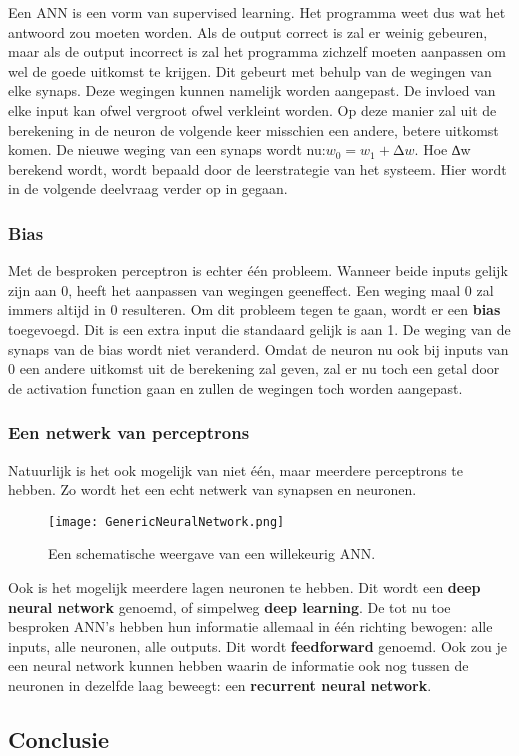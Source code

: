Een ANN is een vorm van supervised learning. Het programma weet dus wat het antwoord zou moeten worden. Als de output correct is zal er weinig gebeuren, maar als de output incorrect is zal het programma zichzelf moeten aanpassen om wel de goede uitkomst te krijgen. Dit gebeurt met behulp van de wegingen van elke synaps. Deze wegingen kunnen namelijk worden aangepast. De invloed van elke input kan ofwel vergroot ofwel verkleint worden. Op deze manier zal uit de berekening in de neuron de volgende keer misschien een andere, betere uitkomst komen. De nieuwe weging van een synaps wordt nu:$ w_{0} = w_{1} + ∆w $.
Hoe ∆w berekend wordt, wordt bepaald door de leerstrategie van het systeem. Hier wordt in de volgende deelvraag verder op in gegaan.

\subsubsection{Bias}
Met de besproken perceptron is echter één probleem. Wanneer beide inputs gelijk zijn aan 0, heeft het aanpassen van wegingen geeneffect. Een weging maal 0 zal immers altijd in 0 resulteren. Om dit probleem tegen te gaan, wordt er een \textbf{bias} toegevoegd. Dit is een extra input die standaard gelijk is aan 1. De weging van de synaps van de bias wordt niet veranderd. Omdat de neuron nu ook bij inputs van 0 een andere uitkomst uit de berekening zal geven, zal er nu toch een getal door de activation function gaan en zullen de wegingen toch worden aangepast. 

\subsubsection{Een netwerk van perceptrons}
Natuurlijk is het ook mogelijk van niet één, maar meerdere perceptrons te hebben. Zo wordt het een echt netwerk van synapsen en neuronen.

\begin{figure}[h]
  \centering
    \texttt{[image: GenericNeuralNetwork.png]}
  \caption{Een schematische weergave van een willekeurig ANN.}
  \label{fig:ANN}
\end{figure}

Ook is het mogelijk meerdere lagen neuronen te hebben. Dit wordt een \textbf{deep neural network} genoemd, of simpelweg \textbf{deep learning}.
De tot nu toe besproken ANN’s hebben hun informatie allemaal in één richting bewogen: alle inputs, alle neuronen, alle outputs. Dit wordt \textbf{feedforward} genoemd. Ook zou je een neural network kunnen hebben waarin de informatie ook nog tussen de neuronen in dezelfde laag beweegt: een \textbf{recurrent neural network}.

\subsection{Conclusie}

